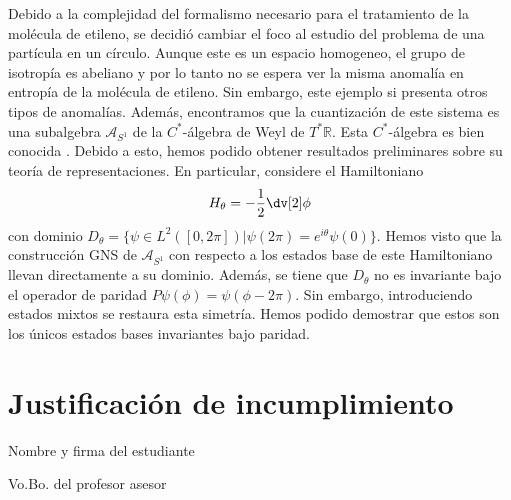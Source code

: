 \documentclass{article}
\begin{document}
Debido a la complejidad del formalismo necesario para el tratamiento de la molécula de etileno, se decidió cambiar el foco al estudio del problema de una partícula en un círculo. Aunque este es un espacio homogeneo, el grupo de isotropía es abeliano y por lo tanto no se espera ver la misma anomalía en entropía de la molécula de etileno. Sin embargo, este ejemplo si presenta otros tipos de anomalías\cite{Balachandran2011}. Además, encontramos que la cuantización de este sistema es una subalgebra $\mathcal{A}_{S^1}$ de la $C^*$-álgebra de Weyl de $T^*\mathbb{R}$. Esta $C^*$-álgebra es bien conocida \cite{Moretti2013}. Debido a esto, hemos podido obtener resultados preliminares sobre su teoría de representaciones. En particular, considere el Hamiltoniano 
\begin{equation}
H_\theta=-\frac{1}{2}\dv[2]\phi
\end{equation} 
con dominio $D_\theta=\{\psi\in L^2([0,2\pi])|\psi(2\pi)=e^{i\theta}\psi(0)\}$. Hemos visto que la construcción GNS de $\mathcal{A}_{S^1}$ con respecto a los estados base de este Hamiltoniano llevan directamente a su dominio. Además, se tiene que $D_\theta$ no es invariante bajo el operador de paridad $P\psi(\phi)=\psi(\phi-2\pi)$. Sin embargo, introduciendo estados mixtos se restaura esta simetría. Hemos podido demostrar que estos son los únicos estados bases invariantes bajo paridad.

\section{Justificación de incumplimiento}



\vspace{1.5cm}
Nombre y firma del estudiante

\vspace{1.5cm}
Vo.Bo. del profesor asesor



\end{document}
